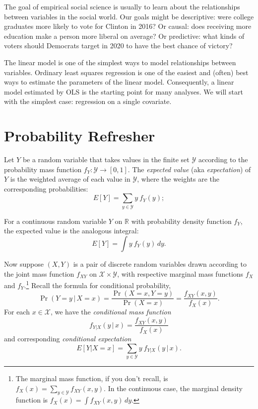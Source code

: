 \documentclass[
  12pt,
  oneside,openany]{book}
\begin{document}
The goal of empirical social science is usually to learn about the relationships between variables in the social world. Our goals might be descriptive: were college graduates more likely to vote for Clinton in 2016? Or causal: does receiving more education make a person more liberal on average? Or predictive: what kinds of voters should Democrats target in 2020 to have the best chance of victory?

The linear model is one of the simplest ways to model relationships between variables. Ordinary least squares regression is one of the easiest and (often) best ways to estimate the parameters of the linear model. Consequently, a linear model estimated by OLS is the starting point for many analyses. We will start with the simplest case: regression on a single covariate.

\hypertarget{probability}{%
\section{Probability Refresher}\label{probability}}

Let \(Y\) be a random variable that takes values in the finite set \(\mathcal{Y}\) according to the probability mass function \(f_Y : \mathcal{Y} \to [0, 1]\). The \emph{expected value} (aka \emph{expectation}) of \(Y\) is the weighted average of each value in \(\mathcal{Y}\), where the weights are the corresponding probabilities:
\begin{equation}
E[Y] = \sum_{y \in \mathcal{Y}} y \: f_Y(y);
\end{equation}

For a continuous random variable \(Y\) on \(\mathbb{R}\) with probability density function \(f_Y\), the expected value is the analogous integral:
\begin{equation}
E[Y] = \int y \: f_Y(y) \, dy.
\end{equation}

Now suppose \((X, Y)\) is a pair of discrete random variables drawn according to the joint mass function \(f_{XY}\) on \(\mathcal{X} \times \mathcal{Y}\), with respective marginal mass functions \(f_X\) and \(f_Y\).\footnote{The marginal mass function, if you don't recall, is \(f_X(x) = \sum_{y \in \mathcal{Y}} f_{XY} (x, y)\). In the continuous case, the marginal density function is \(f_X(x) = \int f_{XY} (x, y) \, dy\).} Recall the formula for conditional probability,
\begin{equation}
\Pr(Y = y \,|\, X = x)
= \frac{\Pr(X = x, Y = y)}{\Pr(X = x)}
= \frac{f_{XY}(x, y)}{f_X(x)}.
\end{equation}
For each \(x \in \mathcal{X}\), we have the \emph{conditional mass function}
\begin{equation}
f_{Y|X}(y \,|\, x) = \frac{f_{XY}(x, y)}{f_X(x)}
\end{equation}
and corresponding \emph{conditional expectation}
\begin{equation}
E[Y | X = x]
= \sum_{y \in \mathcal{Y}} y \: f_{Y|X}(y \,|\, x).
\end{equation}
\end{document}
